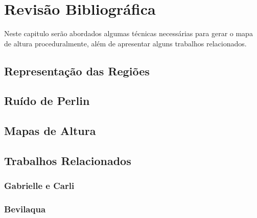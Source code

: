 \chapter{Revisão Bibliográfica}
Neste capitulo serão abordados algumas técnicas necessárias para gerar o mapa
de altura proceduralmente, além de apresentar alguns trabalhos relacionados.

\section{Representação das Regiões}

\section{Ruído de Perlin}

\section{Mapas de Altura}

\section{Trabalhos Relacionados}

\subsection{Gabrielle e Carli}

\subsection{Bevilaqua}